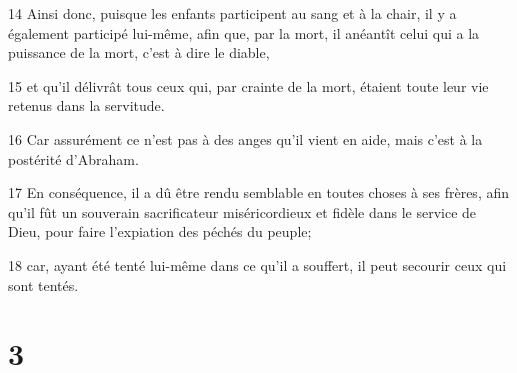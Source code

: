 \par 14 Ainsi donc, puisque les enfants participent au sang et à la chair, il y a également participé lui-même, afin que, par la mort, il anéantît celui qui a la puissance de la mort, c'est à dire le diable,
\par 15 et qu'il délivrât tous ceux qui, par crainte de la mort, étaient toute leur vie retenus dans la servitude.
\par 16 Car assurément ce n'est pas à des anges qu'il vient en aide, mais c'est à la postérité d'Abraham.
\par 17 En conséquence, il a dû être rendu semblable en toutes choses à ses frères, afin qu'il fût un souverain sacrificateur miséricordieux et fidèle dans le service de Dieu, pour faire l'expiation des péchés du peuple;
\par 18 car, ayant été tenté lui-même dans ce qu'il a souffert, il peut secourir ceux qui sont tentés.

\chapter{3}

